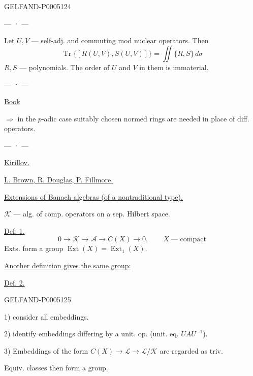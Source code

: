 \begin{GelfandAdjacentEvidence}{GELFAND-P000512}{4}


\begin{center}— · —\end{center}
Let $U,V$ — self-adj. and commuting mod nuclear operators.
Then
\[
\operatorname{Tr}\{[R(U,V),S(U,V)]\}=\iint\{R,S\}\,d\sigma
\]
$R,S$ — polynomials. The order of $U$ and $V$ in them is immaterial.

\begin{center}— · —\end{center}
\uline{Book}\quad{}\quad{}

$\Rightarrow$ in the $p$-adic case suitably chosen normed rings are needed in place of diff. operators.

\begin{center}— · —\end{center}
\uline{Kirillov.}

\uline{L. Brown, R. Douglas, P. Fillmore.}

\uline{Extensions of Banach algebras (of a nontraditional type).}

$\mathcal K$ — alg. of comp. operators on a sep. Hilbert space.

\uline{Def. 1.}
\[
0\to\mathcal K\to\mathcal A\to C(X)\to0,\qquad X\ \text{— compact}
\]
Exts. form a group $\operatorname{Ext}(X)=\operatorname{Ext}_1(X)$.

\uline{Another definition gives the same group:}

\uline{Def. 2.}
\end{GelfandAdjacentEvidence}
\begin{GelfandAdjacentEvidence}{GELFAND-P000512}{5}


1) consider all embeddings.

2) identify embeddings differing by a unit. op. (unit. eq. $UAU^{-1}$).

3) Embeddings of the form $C(X)\to\mathcal L\to\mathcal L/\mathcal K$ are regarded as triv.

Equiv. classes then form a group.
\end{GelfandAdjacentEvidence}
